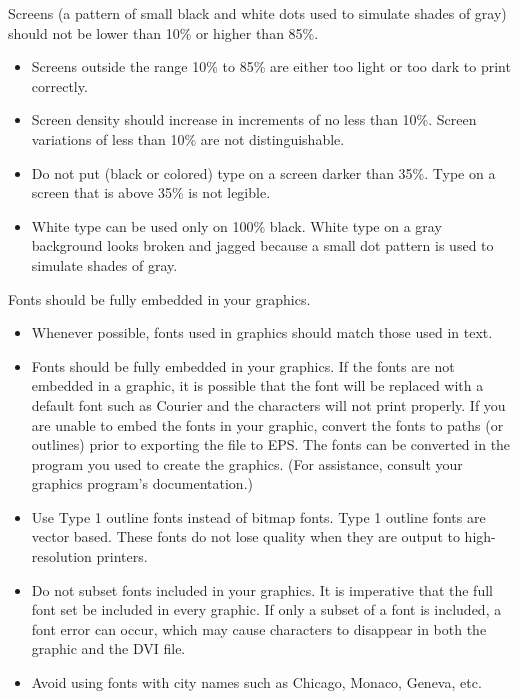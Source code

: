 %
 {Screens (a pattern of small black and white dots used to simulate shades
  of gray) should not be lower than 10\% or higher than 85\%.}

\begin{itemize}
\item Screens outside the range 10\% to 85\% are either too light or too
 dark to print correctly.
\item Screen density should increase in increments of no less than 10\%.
 Screen variations of less than 10\% are not distinguishable.
\item Do not put (black or colored) type on a screen darker than 35\%.
 Type on a screen that is above 35\% is not legible.
\item White type can be used only on 100\% black.
 White type on a gray background looks broken and jagged because a small
 dot pattern is used to simulate shades of gray.
\end{itemize}

%
{Fonts should be fully embedded in your graphics.} 

\begin{itemize}
\item Whenever possible, fonts used in graphics should match those used in text.
\item Fonts should be fully embedded in your graphics.
 If the fonts are not embedded in a graphic, it is possible that the font
 will be replaced with a default font such as Courier and the characters
 will not print properly. If you are unable to embed the fonts in your
 graphic, convert the fonts to paths (or outlines) prior to exporting the
 file to EPS\@.  The fonts can be converted in the program you used to create
 the graphics. (For assistance, consult your graphics program's
 documentation.)
\item Use Type 1 outline fonts instead of bitmap fonts.
 Type 1 outline fonts are vector based. These fonts do not lose quality
 when they are output to high-resolution printers.
\item Do not subset fonts included in your graphics.
 It is imperative that the full font set be included in every graphic. If
 only a subset of a font is included, a font error can occur, which may
 cause characters to disappear in both the graphic and the DVI file.
\item Avoid using fonts with city names such as Chicago, Monaco, Geneva, etc.
\end{itemize}

